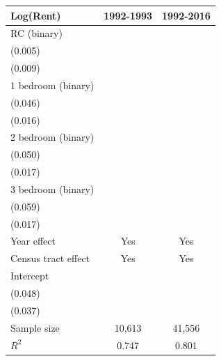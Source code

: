 \begin{table}[p]
\footnotesize
\begin{center}
\begin{tabular}{lcc}
\toprule
Log(Rent) & 1992-1993 & 1992-2016 \\
\midrule
RC (binary) & \makecell{$-0.128^{\star\star\star}$\\(0.005)} & \makecell{$-0.098^{\star\star\star}$\\
(0.009)} \\
1 bedroom (binary) & \makecell{$0.189^{\star\star\star}$\\(0.046)} & \makecell{$0.147^{\star\star\star}$\\(0.016)} \\
2 bedroom (binary) & \makecell{$0.328^{\star\star\star}$\\(0.050)} & \makecell{$0.300^{\star\star\star}$\\(0.017)}\\
3 bedroom (binary) & \makecell{$0.516^{\star\star\star}$\\(0.059)} & \makecell{$0.455^{\star\star\star}$\\(0.017)}\\
Year effect & Yes & Yes \\
Census tract effect & Yes & Yes\\
Intercept & \makecell{$6.341^{\star\star\star}$\\(0.048)} & \makecell{$6.288^{\star\star\star}$\\(0.037)}\\
Sample size & 10,613 & 41,556\\
$R^{2}$ & 0.747 & 0.801 \\
\bottomrule
\end{tabular}
\end{center}
\normalsize
\end{table}